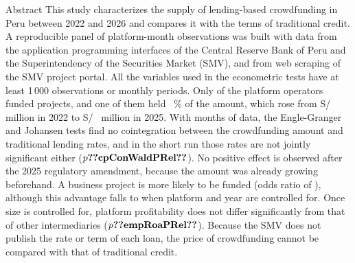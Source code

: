 \begin{resumen}{Abstract}
This study characterizes the supply of lending-based crowdfunding in Peru between 2022 and 2026 and compares it with the terms of traditional credit. A reproducible panel of  platform-month observations was built with data from the application programming interfaces of the Central Reserve Bank of Peru and the Superintendency of the Securities Market (SMV), and from web scraping of the SMV project portal. All the variables used in the econometric tests have at least 1\,000 observations or  monthly periods. Only  of the  platform operators funded projects, and one of them held ~\% of the amount, which rose from S/~ million in 2022 to S/~ million in 2025. With  months of data, the Engle-Granger and Johansen tests find no cointegration between the crowdfunding amount and traditional lending rates, and in the short run those rates are not jointly significant either ($p\cifra{cpConWaldPRel}$). No positive effect is observed after the 2025 regulatory amendment, because the amount was already growing beforehand. A business project is more likely to be funded (odds ratio of ), although this advantage falls to  when platform and year are controlled for. Once size is controlled for, platform profitability does not differ significantly from that of other intermediaries ($p\cifra{empRoaPRel}$). Because the SMV does not publish the rate or term of each loan, the price of crowdfunding cannot be compared with that of traditional credit.
\end{resumen}
